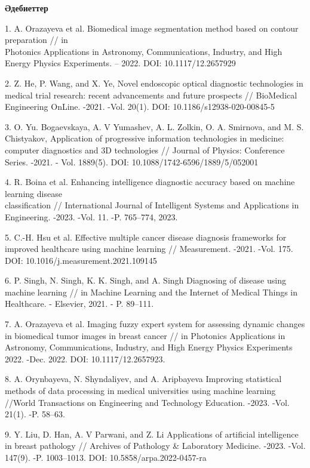 \begin{center}
{\bfseries Әдебиеттер}
\end{center}

\begin{references}
1. A. Orazayeva et al. Biomedical image segmentation method based on
contour preparation // in \\Photonics Applications in Astronomy,
Communications, Industry, and High Energy Physics Experiments. -- 2022.
DOI: 10.1117/12.2657929

2. Z. He, P. Wang, and X. Ye, Novel endoscopic optical diagnostic
technologies in medical trial research: recent advancements and future
prospects // BioMedical Engineering OnLine. -2021. -Vol. 20(1). DOI:
10.1186/s12938-020-00845-5

3. O. Yu. Bogaevskaya, A. V Yumashev, A. L. Zolkin, O. A. Smirnova, and
M. S. Chistyakov, Application of progressive information technologies in
medicine: computer diagnostics and 3D technologies // Journal of
Physics: Conference Series. -2021. - Vol. 1889(5). DOI:
10.1088/1742-6596/1889/5/052001

4. R. Boina et al. Enhancing intelligence diagnostic accuracy based on
machine learning disease \\classification // International Journal of
Intelligent Systems and Applications in Engineering. -2023. -Vol. 11.
-P. 765--774, 2023.

5. C.-H. Hsu et al. Effective multiple cancer disease diagnosis
frameworks for improved healthcare using machine learning //
Measurement. -2021. -Vol. 175. DOI: 10.1016/j.measurement.2021.109145

6. P. Singh, N. Singh, K. K. Singh, and A. Singh Diagnosing of disease
using machine learning // in Machine Learning and the Internet of
Medical Things in Healthcare. - Elsevier, 2021. - P. 89--111.

7. A. Orazayeva et al. Imaging fuzzy expert system for assessing dynamic
changes in biomedical tumor images in breast cancer // in Photonics
Applications in Astronomy, Communications, Industry, and High Energy
Physics Experiments 2022. -Dec. 2022. DOI: 10.1117/12.2657923.

8. A. Orynbayeva, N. Shyndaliyev, and A. Aripbayeva Improving
statistical methods of data processing in medical universities using
machine learning //World Transactions on Engineering and Technology
Education. -2023. -Vol. 21(1). -P. 58--63.

9. Y. Liu, D. Han, A. V Parwani, and Z. Li Applications of artificial
intelligence in breast pathology // Archives of Pathology \& Laboratory
Medicine. -2023. -Vol. 147(9). -P. 1003--1013. DOI:
10.5858/arpa.2022-0457-ra


\end{references}
